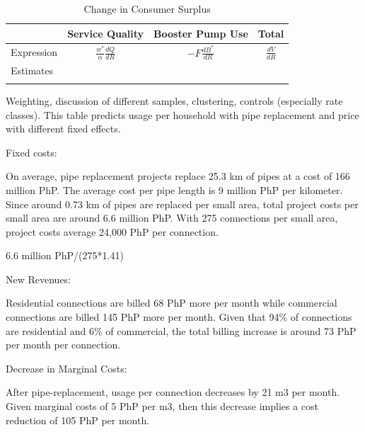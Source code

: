 \documentclass[12pt,table]{article}
\begin{document}
\begin{table}[h!] 
\centering
\caption{Change in Consumer Surplus}\label{table:mainregs}
\vspace{-2mm}
\begin{threeparttable}
\begin{tabular}{@{}l*{1}{CCC}@{}}
\toprule
            & Service Quality              & Booster Pump Use & Total             \\
\midrule
Expression  & $\frac{w^{*}}{\alpha} \frac{dQ}{dR}$ &   $- F \frac{dB^{*}}{dR}$  & $\frac{dV}{dR}$ \\[1em]
Estimates   &   \\
            &    \\
\bottomrule
\end{tabular}
\begin{tablenotes}
\footnotesize
\item Weighting, discussion of different samples, clustering, controls (especially rate classes).  This table predicts usage per household with pipe replacement and price with different fixed effects.  
\end{tablenotes}
\end{threeparttable}
\end{table}







Fixed costs:

On average, pipe replacement projects replace 25.3 km of pipes at a cost of 166 million PhP.  The average cost per pipe length is 9 million PhP per kilometer.  Since around 0.73 km of pipes are replaced per small area, total project costs per small area are around 6.6 million PhP.  With 275 connections per small area, project costs average 24,000 PhP per connection.   

6.6 million PhP/(275*1.41)


New Revenues:

Residential connections are billed 68 PhP more per month while commercial connections are billed 145 PhP more per month.  Given that 94\% of connections are residential and 6\% of commercial, the total billing increase is around 73 PhP per month per connection.  

Decrease in Marginal Costs:

After pipe-replacement, usage per connection decreases by 21 m3 per month.  Given marginal costs of 5 PhP per m3, then this decrease implies a cost reduction of 105 PhP per month.  
\end{document}
